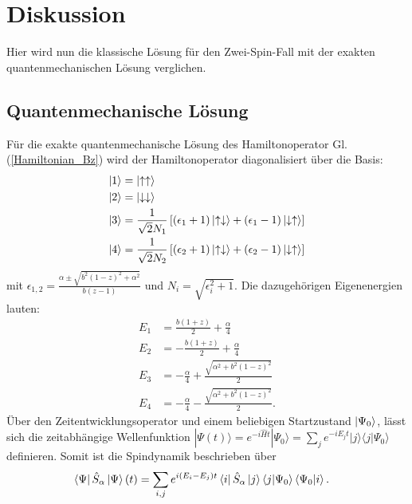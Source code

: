 \chapter{Diskussion}
Hier wird nun die klassische Lösung für den Zwei-Spin-Fall mit der exakten quantenmechanischen Lösung verglichen.
\section{Quantenmechanische Lösung}
Für die exakte quantenmechanische Lösung des Hamiltonoperator Gl. (\ref{Hamiltonian_Bz}) wird der Hamiltonoperator diagonalisiert über die Basis:
\begin{align}
    \ket{1} &= \ket{\uparrow\uparrow}   \\
    \ket{2} &= \ket{\downarrow\downarrow} \\
    \ket{3} &= \frac{1}{\sqrt{2}N_1}\left[(\epsilon_1+1)\ket{\uparrow\downarrow} +(\epsilon_1-1)\ket{\downarrow\uparrow} \right]\\
    \ket{4} &= \frac{1}{\sqrt{2}N_2}\left[(\epsilon_2+1)\ket{\uparrow\downarrow} +(\epsilon_2-1)\ket{\downarrow\uparrow} \right]
\end{align}
mit $\epsilon_{1,2} = \frac{\alpha \pm \sqrt{b^2(1-z)^2+\alpha^2} }{b(z-1)} $ und $N_{i} = \sqrt{\epsilon_i^2 + 1}$. Die dazugehörigen Eigenenergien lauten:
\begin{align}
    E_1 &= \frac{b(1+z)}{2} + \frac{\alpha}{4}\\
    E_2 &= -\frac{b(1+z)}{2} + \frac{\alpha}{4}\\
    E_3 &= -\frac{\alpha}{4} + \frac{\sqrt{\alpha^2 + b^2(1-z)^2}}{2}\\
    E_4 &= -\frac{\alpha}{4} - \frac{\sqrt{\alpha^2 + b^2(1-z)^2}}{2}.
\end{align}
\noindent Über den Zeitentwicklungsoperator und einem beliebigen Startzustand $\ket{\Psi_0}$, lässt sich die zeitabhängige Wellenfunktion 
$|\Psi(t)\rangle = e^{-i\hat{H}t}|\Psi_0\rangle = \sum_j e^{-i E_j t}|j\rangle\langle j|\Psi_0\rangle$ definieren. Somit ist die Spindynamik
beschrieben über
\begin{align}
    \bra{\Psi}\hat{S}_\alpha\ket{\Psi}(t) &= \sum_{i,j}e^{i(E_i-E_j)t}\bra{i}\hat{S}_\alpha\ket{j}\bra{j}\ket{\Psi_0}\bra{\Psi_0}\ket{i}.
\end{align}
